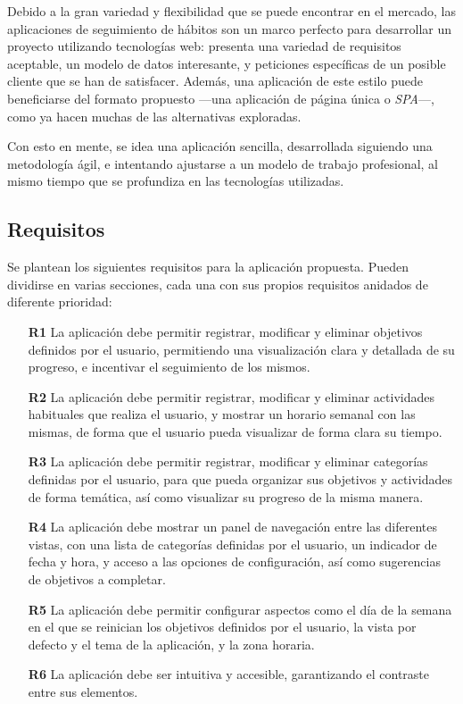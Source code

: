 \documentclass[10pt, a4paper]{aqademic}
\begin{document}
Debido a la gran variedad y flexibilidad que se puede encontrar en el mercado, las aplicaciones de seguimiento de hábitos son un marco perfecto para desarrollar un proyecto utilizando tecnologías web: presenta una variedad de requisitos aceptable, un modelo de datos interesante, y peticiones específicas de un posible cliente que se han de satisfacer. Además, una aplicación de este estilo puede beneficiarse del formato propuesto ---una aplicación de página única o \textit{SPA}---, como ya hacen muchas de las alternativas exploradas.

Con esto en mente, se idea una aplicación sencilla, desarrollada siguiendo una metodología ágil, e intentando ajustarse a un modelo de trabajo profesional, al mismo tiempo que se profundiza en las tecnologías utilizadas.


\subsection{Requisitos}

Se plantean los siguientes requisitos para la aplicación propuesta. Pueden dividirse en varias secciones, cada una con sus propios requisitos anidados de diferente prioridad:

\begin{itemize}
	\item[\textbf{R1}] La aplicación debe permitir registrar, modificar y eliminar objetivos definidos por el usuario, permitiendo una visualización clara y detallada de su progreso, e incentivar el seguimiento de los mismos.
	
	\item[\textbf{R2}] La aplicación debe permitir registrar, modificar y eliminar actividades habituales que realiza el usuario, y mostrar un horario semanal con las mismas, de forma que el usuario pueda visualizar de forma clara su tiempo.
	
	\item[\textbf{R3}] La aplicación debe permitir registrar, modificar y eliminar categorías definidas por el usuario, para que pueda organizar sus objetivos y actividades de forma temática, así como visualizar su progreso de la misma manera.
	
	\item[\textbf{R4}] La aplicación debe mostrar un panel de navegación entre las diferentes vistas, con una lista de categorías definidas por el usuario, un indicador de fecha y hora, y acceso a las opciones de configuración, así como sugerencias de objetivos a completar.
	
	\item[\textbf{R5}] La aplicación debe permitir configurar aspectos como el día de la semana en el que se reinician los objetivos definidos por el usuario, la vista por defecto y el tema de la aplicación, y la zona horaria.
	
	\item[\textbf{R6}] La aplicación debe ser intuitiva y accesible, garantizando el contraste entre sus elementos.
\end{itemize}
\end{document}
